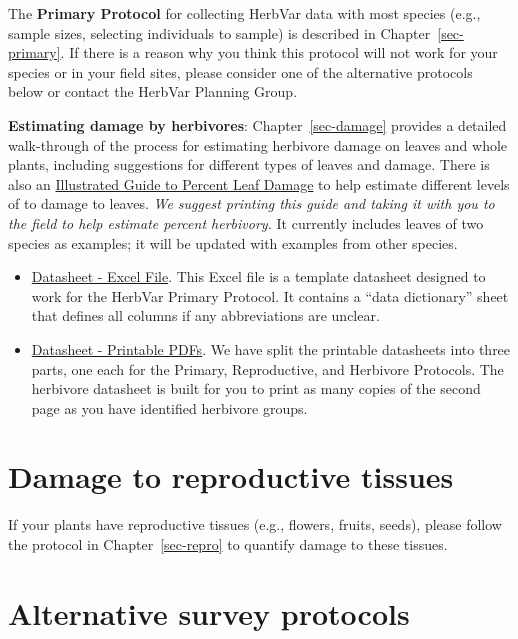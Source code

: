 \documentclass[
  letterpaper,
  oneside,
  open=any]{scrbook}
\begin{document}
The \textbf{Primary Protocol} for collecting HerbVar data with most
species (e.g., sample sizes, selecting individuals to sample) is
described in Chapter~\ref{sec-primary}. If there is a reason why you
think this protocol will not work for your species or in your field
sites, please consider one of the alternative protocols below or contact
the HerbVar Planning Group.

\textbf{Estimating damage by herbivores}: Chapter~\ref{sec-damage}
provides a detailed walk-through of the process for estimating herbivore
damage on leaves and whole plants, including suggestions for different
types of leaves and damage. There is also an
\href{./protocols/Illustrated\%20Guide\%20to\%20Percent\%20Leaf\%20Damage.pdf}{Illustrated
Guide to Percent Leaf Damage} to help estimate different levels of to
damage to leaves. \emph{We suggest printing this guide and taking it
with you to the field to help estimate percent herbivory.} It currently
includes leaves of two species as examples; it will be updated with
examples from other species.

\begin{itemize}
\item
  \href{protocols/HerbVar_Datasheet_Template.xlsx}{Datasheet - Excel
  File}. This Excel file is a template datasheet designed to work for
  the HerbVar Primary Protocol. It contains a ``data dictionary'' sheet
  that defines all columns if any abbreviations are unclear.
\item
  \href{https://drive.google.com/drive/folders/10-9xPm9yOAvGCtL3dmVaoz7ODI1fghYG?usp=sharing}{Datasheet
  - Printable PDFs}. We have split the printable datasheets into three
  parts, one each for the Primary, Reproductive, and Herbivore
  Protocols. The herbivore datasheet is built for you to print as many
  copies of the second page as you have identified herbivore groups.
\end{itemize}

\section{Damage to reproductive
tissues}\label{damage-to-reproductive-tissues}

If your plants have reproductive tissues (e.g., flowers, fruits, seeds),
please follow the protocol in Chapter~\ref{sec-repro} to quantify damage
to these tissues.

\section{Alternative survey
protocols}\label{alternative-survey-protocols}
\end{document}
